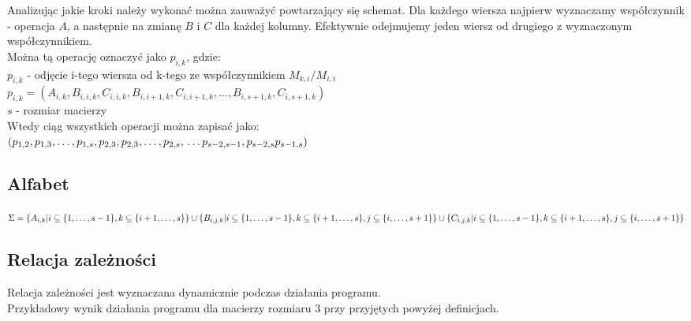 \documentclass[12pt, letterpaper]{article}
\begin{document}
Analizując jakie kroki należy wykonać można zauważyć powtarzający się schemat.
Dla każdego  wiersza najpierw wyznaczamy współczynnik - operacja $A$, a następnie
na zmianę  $B$ i $C$ dla każdej kolumny. Efektywnie odejmujemy jeden wiersz od drugiego z wyznaczonym współczynnikiem. \\
Można tą operację oznaczyć jako $p_{i,k}$, gdzie: \\
$ p_{i,k} $ - odjęcie i-tego wiersza od k-tego ze współczynnikiem $M_{k,i}/M_{i,i}$ \\
$ p_{i,k} = ( A_{i,k}, B_{i,i,k}, C_{i,i,k}, B_{i,i+1,k}, C_{i,i+1,k},\ldots,B_{i, s+1, k}, C_{i,s+1,k}) $ \\
$s$ - rozmiar macierzy \\
Wtedy ciąg wszystkich operacji można zapisać jako: \\
$ (p_{1,2}, p_{1,3}, \ldots, p_{1,s},\\
	p_{2,3}, p_{2,3}, \ldots, p_{2, s},\\
	\ldots\\
	p_{s-2, s-1}, p_{s-2, s} \\
	p_{s-1, s}
	) $

\subsection{Alfabet}

$ \Sigma = \{ A_{i,k} | i \subseteq \{1, \ldots, s-1\}, k \subseteq \{ i+1, \ldots, s \}\} \cup \\
	\{ B_{i,j,k} | i \subseteq \{1, \ldots, s-1\}, k \subseteq \{ i+1, \ldots, s \}, j \subseteq \{ i, \ldots, s+1 \}\} \cup \\
	\{ C_{i,j,k} | i \subseteq \{1, \ldots, s-1\}, k \subseteq \{ i+1, \ldots, s \}, j \subseteq \{ i, \ldots, s+1 \}\}$

\subsection{Relacja zależności}

Relacja zależności jest wyznaczana dynamicznie podczas działania programu. \\
Przykładowy wynik działania programu dla macierzy rozmiaru 3 przy przyjętych powyżej definicjach.
\end{document}
